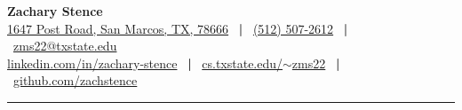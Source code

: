 \documentclass[letterpaper, 10pt]{article}
\makeatletter
\newcommand{\ressubheading}[4]{
\begin{tabular*}{6.609in}{l@{\cftdotfill{\cftsecdotsep}\extracolsep{\fill}}r}
        \textbf{#1} & #2 \\
        \textit{#3} & #4 \\
\end{tabular*}\vspace{-6pt}}
\newcommand{\sep}{\ \textbf{|} \ }
\makeatother
\begin{document}


%
%


\textbf{\huge Zachary Stence} \\[2pt]
 \href{https://goo.gl/maps/74EMXYjFi2t}{1647 Post Road, San Marcos, TX, 78666} \sep \href{tel:15125072612}{(512) 507-2612} \sep \href{mailto:zms22@txstate.edu}{zms22@txstate.edu} \\
 \href{https://www.linkedin.com/in/zachary-stence}{linkedin.com/in/zachary-stence} \sep \href{http://cs.txstate.edu/~zms22}{cs.txstate.edu/$\sim$zms22} \sep \href{https://www.github.com/zachstence}{github.com/zachstence} \\[6pt]

\hrule

\vspace{2pt}

%
%



\end{document}
